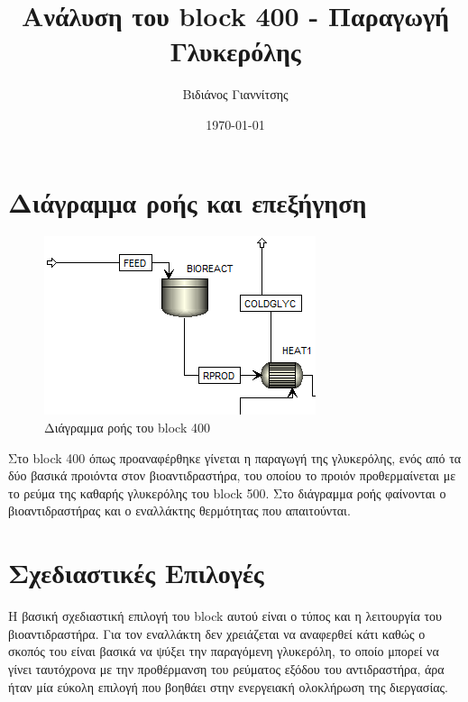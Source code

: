 \documentclass[11pt]{article}
\author{Βιδιάνος Γιαννίτσης}
\date{\today}
\title{Ανάλυση του block 400 - Παραγωγή Γλυκερόλης}
\begin{document}
\maketitle
\tableofcontents

\renewcommand{\abstractname}{Περίληψη}
\renewcommand{\tablename}{Πίνακας}
\renewcommand{\figurename}{Σχήμα}
\renewcommand\listingscaption{Κώδικας}

\section{Διάγραμμα ροής και επεξήγηση}
\label{sec:org8f5951f}
\begin{figure}[htbp]
\centering
\includegraphics[width=.9\linewidth]{Διάγραμμα_ροής_και_Επεξήγηση/2023-01-12_16-53-41_screenshot.png}
\caption{Διάγραμμα ροής του block 400}
\end{figure}

Στο block 400 όπως προαναφέρθηκε γίνεται η παραγωγή της γλυκερόλης, ενός από τα δύο βασικά προιόντα στον βιοαντιδραστήρα, του οποίου το προιόν προθερμαίνεται με το ρεύμα της καθαρής γλυκερόλης του block 500. Στο διάγραμμα ροής φαίνονται ο βιοαντιδραστήρας και ο εναλλάκτης θερμότητας που απαιτούνται.

\section{Σχεδιαστικές Επιλογές}
\label{sec:org1e50cce}
Η βασική σχεδιαστική επιλογή του block αυτού είναι ο τύπος και η λειτουργία του βιοαντιδραστήρα. Για τον εναλλάκτη δεν χρειάζεται να αναφερθεί κάτι καθώς ο σκοπός του είναι βασικά να ψύξει την παραγόμενη γλυκερόλη, το οποίο μπορεί να γίνει ταυτόχρονα με την προθέρμανση του ρεύματος εξόδου του αντιδραστήρα, άρα ήταν μία εύκολη επιλογή που βοηθάει στην ενεργειακή ολοκλήρωση της διεργασίας.
\end{document}
